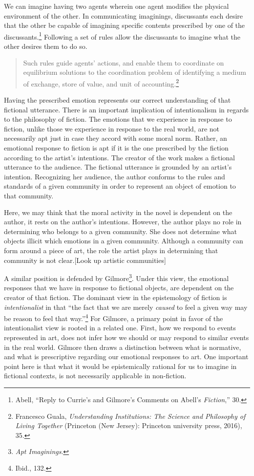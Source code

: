 \documentclass[phdthesis,12pt,final,a4paper]{wuthesis}
\theoremstyle{definition}
\theoremstyle{definition}
\theoremstyle{definition}
\theoremstyle{definition}
\theoremstyle{remark}
\begin{document}
We can imagine having two agents wherein one agent modifies the physical environment of the other. In communicating imaginings, discussants each desire that the other be capable of imagining specific contents prescribed by one of the discussants.\footnote{Abell, {``Reply to {Currie}'s and {Gilmore}'s Comments on {Abell}'s {\emph{Fiction}},''} 30.} Following a set of rules allow the discussants to imagine what the other desires them to do so.

\begin{quote}
Such rules guide agents' actions, and enable them to coordinate on equilibrium solutions to the coordination problem of identifying a medium of exchange, store of value, and unit of accounting.\footnote{Francesco Guala, \emph{Understanding {Institutions}: {The Science} and {Philosophy} of {Living Together}} (Princeton (New Jersey): Princeton university press, 2016), 35.}
\end{quote}

Having the prescribed emotion represents our correct understanding of that fictional utterance. There is an important implication of intentionalism in regards to the philosophy of fiction. The emotions that we experience in response to fiction, unlike those we experience in response to the real world, are not necessarily apt just in case they accord with some moral norm. Rather, an emotional response to fiction is apt if it is the one prescribed by the fiction according to the artist's intentions. The creator of the work makes a fictional utterance to the audience. The fictional utterance is grounded by an artist's intention. Recognizing her audience, the author conforms to the rules and standards of a given community in order to represent an object of emotion to that community.

Here, we may think that the moral activity in the novel is dependent on the author, it rests on the author's intentions. However, the author plays no role in determining who belongs to a given community. She does not determine what objects illicit which emotions in a given community. Although a community can form around a piece of art, the role the artist plays in determining that community is not clear.{[}Look up artistic communities{]}

A similar position is defended by Gilmore\footnote{\emph{Apt {Imaginings}}.}. Under this view, the emotional responses that we have in response to fictional objects, are dependent on the creator of that fiction. The dominant view in the epistemology of fiction is \emph{intentionalist} in that ``the fact that we are merely \emph{caused} to feel a given way may be reason to feel that way.''\footnote{Ibid., 132.} For Gilmore, a primary point in favor of the intentionalist view is rooted in a related one. First, how we respond to events represented in art, does not infer how we should or may respond to similar events in the real world. Gilmore then draws a distinction between what is normative, and what is prescriptive regarding our emotional responses to art. One important point here is that what it would be epistemically rational for us to imagine in fictional contexts, is not necessarily applicable in non-fiction.
\end{document}

